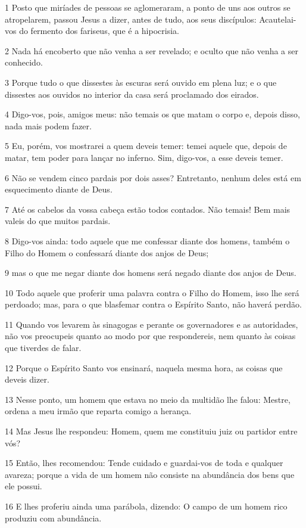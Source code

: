 \par 1 Posto que miríades de pessoas se aglomeraram, a ponto de uns aos outros se atropelarem, passou Jesus a dizer, antes de tudo, aos seus discípulos: Acautelai-vos do fermento dos fariseus, que é a hipocrisia.
\par 2 Nada há encoberto que não venha a ser revelado; e oculto que não venha a ser conhecido.
\par 3 Porque tudo o que dissestes às escuras será ouvido em plena luz; e o que dissestes aos ouvidos no interior da casa será proclamado dos eirados.
\par 4 Digo-vos, pois, amigos meus: não temais os que matam o corpo e, depois disso, nada mais podem fazer.
\par 5 Eu, porém, vos mostrarei a quem deveis temer: temei aquele que, depois de matar, tem poder para lançar no inferno. Sim, digo-vos, a esse deveis temer.
\par 6 Não se vendem cinco pardais por dois asses? Entretanto, nenhum deles está em esquecimento diante de Deus.
\par 7 Até os cabelos da vossa cabeça estão todos contados. Não temais! Bem mais valeis do que muitos pardais.
\par 8 Digo-vos ainda: todo aquele que me confessar diante dos homens, também o Filho do Homem o confessará diante dos anjos de Deus;
\par 9 mas o que me negar diante dos homens será negado diante dos anjos de Deus.
\par 10 Todo aquele que proferir uma palavra contra o Filho do Homem, isso lhe será perdoado; mas, para o que blasfemar contra o Espírito Santo, não haverá perdão.
\par 11 Quando vos levarem às sinagogas e perante os governadores e as autoridades, não vos preocupeis quanto ao modo por que respondereis, nem quanto às coisas que tiverdes de falar.
\par 12 Porque o Espírito Santo vos ensinará, naquela mesma hora, as coisas que deveis dizer.
\par 13 Nesse ponto, um homem que estava no meio da multidão lhe falou: Mestre, ordena a meu irmão que reparta comigo a herança.
\par 14 Mas Jesus lhe respondeu: Homem, quem me constituiu juiz ou partidor entre vós?
\par 15 Então, lhes recomendou: Tende cuidado e guardai-vos de toda e qualquer avareza; porque a vida de um homem não consiste na abundância dos bens que ele possui.
\par 16 E lhes proferiu ainda uma parábola, dizendo: O campo de um homem rico produziu com abundância.
